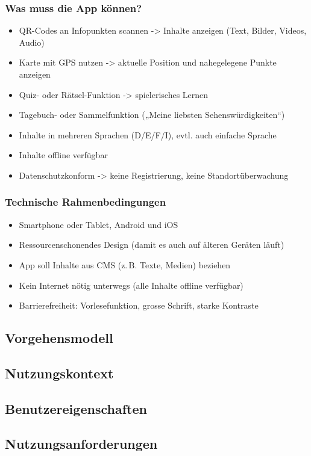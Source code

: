 \documentclass[10pt]{article}
\begin{document}
	\subsubsection[Was]{Was muss die App können?}
	\begin{itemize}
		\item QR-Codes an Infopunkten scannen -> Inhalte anzeigen (Text, Bilder, Videos, Audio)
		\item Karte mit GPS nutzen -> aktuelle Position und nahegelegene Punkte anzeigen
		\item Quiz- oder Rätsel-Funktion -> spielerisches Lernen
		\item Tagebuch- oder Sammelfunktion („Meine liebsten Sehenswürdigkeiten“)
		\item Inhalte in mehreren Sprachen (D/E/F/I), evtl. auch einfache Sprache
		\item Inhalte offline verfügbar
		\item Datenschutzkonform -> keine Registrierung, keine Standortüberwachung
	\end{itemize}
	\subsubsection[Womit]{Technische Rahmenbedingungen}
	\begin{itemize}
		\item Smartphone oder Tablet, Android und iOS
		\item Ressourcenschonendes Design (damit es auch auf älteren Geräten läuft)
		\item App soll Inhalte aus CMS (z. B. Texte, Medien) beziehen
		\item Kein Internet nötig unterwegs (alle Inhalte offline verfügbar)
		\item Barrierefreiheit: Vorlesefunktion, grosse Schrift, starke Kontraste
	\end{itemize}
	\subsection{Vorgehensmodell}
	\subsection{Nutzungskontext}
	\subsection{Benutzereigenschaften}
	\subsection{Nutzungsanforderungen}
\end{document}
